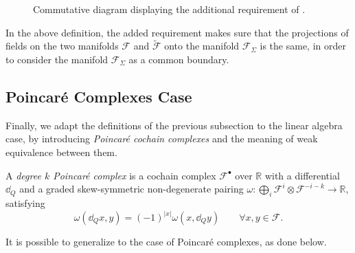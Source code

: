 \begin{figure}
    \centering
    
    \caption{Commutative diagram displaying the additional requirement of .}
    \label{fig:weak_equiv}
\end{figure}

In the above definition, the added requirement makes sure that the projections of fields on the two manifolds $\mathcal{F}$ and $\widetilde{\mathcal{F}}$ onto the manifold $\mathcal{F}_\Sigma$ is the same, in order to consider the manifold $\mathcal{F}_\Sigma$ as a common boundary.

\subsection{Poincaré Complexes Case}
\label{subsec:Poincaré_complex_case}

Finally, we adapt the definitions of the previous subsection to the linear algebra case, by introducing \emph{Poincaré cochain complexes} and the meaning of weak equivalence between them.

\begin{definition}
    A \emph{degree $k$ Poincaré complex} is a cochain complex $\mathcal{F}^\bullet$ over $\mathbb{R}$ with a differential $\dd_Q$ and a graded skew-symmetric non-degenerate pairing $\omega : \bigoplus_i \mathcal{F}^i \otimes \mathcal{F}^{-i-k} \rightarrow \mathbb{R}$, satisfying
    \begin{equation*}
        \omega(\dd_Q x, y) = (-1)^{|x|} \omega (x, \dd_Q y) \qquad \forall x, y \in \mathcal{F} .
    \end{equation*}
\end{definition}

It is possible to generalize  to the case of Poincaré complexes, as done below.

